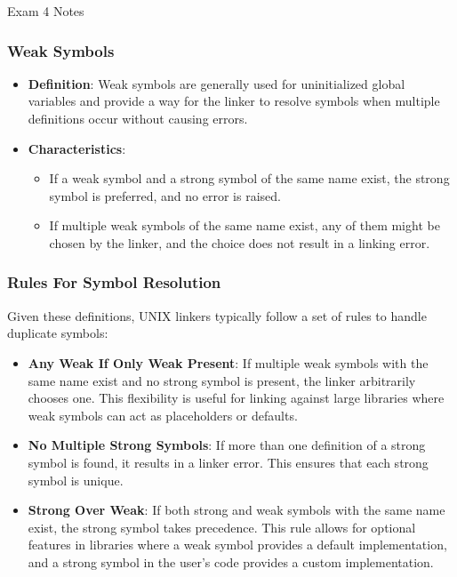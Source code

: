 \begin{examnotes}{Exam 4 Notes}
    \subsubsection*{Weak Symbols}

    \begin{itemize}
        \item \textbf{Definition}: Weak symbols are generally used for uninitialized global variables and provide a way for the linker to resolve symbols when multiple definitions occur without causing errors.
        \item \textbf{Characteristics}:
        \begin{itemize}
            \item If a weak symbol and a strong symbol of the same name exist, the strong symbol is preferred, and no error is raised.
            \item If multiple weak symbols of the same name exist, any of them might be chosen by the linker, and the choice does not result in a linking error.
        \end{itemize}
    \end{itemize}

    \subsubsection*{Rules For Symbol Resolution}

    Given these definitions, UNIX linkers typically follow a set of rules to handle duplicate symbols:

    \begin{itemize}
        \item \textbf{Any Weak If Only Weak Present}: If multiple weak symbols with the same name exist and no strong symbol is present, the linker arbitrarily chooses one. This flexibility is useful 
        for linking against large libraries where weak symbols can act as placeholders or defaults.
        \item \textbf{No Multiple Strong Symbols}: If more than one definition of a strong symbol is found, it results in a linker error. This ensures that each strong symbol is unique.
        \item \textbf{Strong Over Weak}: If both strong and weak symbols with the same name exist, the strong symbol takes precedence. This rule allows for optional features in libraries where a weak 
        symbol provides a default implementation, and a strong symbol in the user's code provides a custom implementation.
    \end{itemize}


\end{examnotes}
